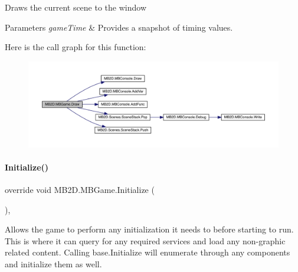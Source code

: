 Draws the current scene to the window 


\begin{DoxyParams}{Parameters}
{\em game\+Time} & Provides a snapshot of timing values.\\
\hline
\end{DoxyParams}
Here is the call graph for this function\+:
\nopagebreak
\begin{figure}[H]
\begin{center}
\leavevmode
\includegraphics[width=350pt]{class_m_b2_d_1_1_m_b_game_ad791072c4d2a5b23bbaec3542d6facc9_cgraph}
\end{center}
\end{figure}
\hypertarget{class_m_b2_d_1_1_m_b_game_a2157be479c1831c49301cd472cc01cde}{}\label{class_m_b2_d_1_1_m_b_game_a2157be479c1831c49301cd472cc01cde} 
\paragraph{\texorpdfstring{Initialize()}{Initialize()}}
{\footnotesize\ttfamily override void M\+B2\+D.\+M\+B\+Game.\+Initialize (\begin{DoxyParamCaption}{ }\end{DoxyParamCaption})\hspace{0.3cm}{\ttfamily [inline]}, {\ttfamily [protected]}}



Allows the game to perform any initialization it needs to before starting to run. This is where it can query for any required services and load any non-\/graphic related content. Calling base.\+Initialize will enumerate through any components and initialize them as well. 

